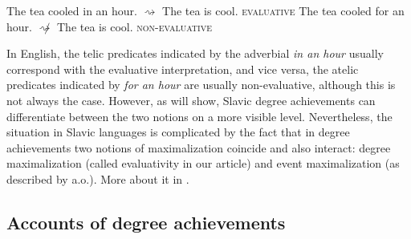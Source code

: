 \documentclass[output=paper]{langscibook}
\begin{document}

\ea\label{DA:ex:tea_inference}
\ea\label{DA:ex:tea_inference_eval} The tea cooled in an hour. $\rightsquigarrow$ The tea is cool. \hfill \textsc{evaluative}
\ex\label{DA:ex:tea_inference_noneval} The tea cooled for an hour. {$\not\rightsquigarrow$} The tea is cool. \hfill \textsc{non-evaluative}
\z\z

\noindent In English, the telic predicates indicated by the adverbial \textit{in an hour} usually correspond with the evaluative interpretation, and vice versa, the atelic predicates indicated by \textit{for an hour} are usually non-evaluative, although this is not always the case. However, as  will show, Slavic degree achievements can differentiate between the two notions on a more visible level. Nevertheless, the situation in Slavic languages is complicated by the fact that in degree achievements two notions of maximalization coincide and also interact: degree maximalization (called evaluativity in our article) and event maximalization (as described by \citealt{krifka_manfred_thematic_1992,Filip2008} a.o.). More about it in .

\subsection{Accounts of degree achievements}\label{DA:subsec:Accounts of degree achievements}
\end{document}

